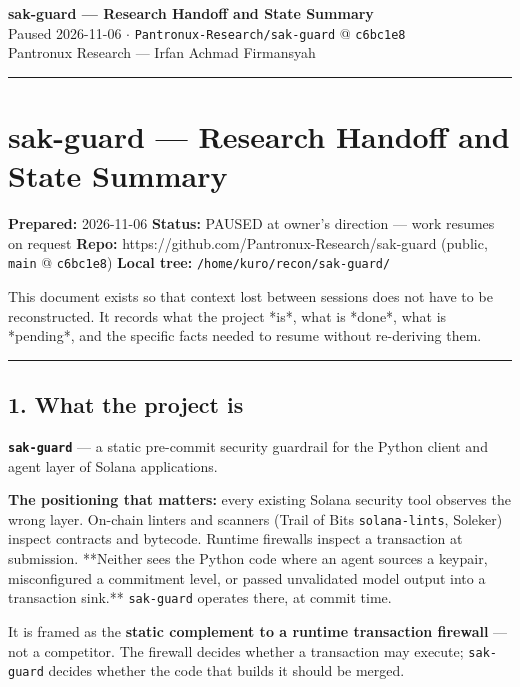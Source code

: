 \documentclass[10pt,a4paper]{article}
\begin{document}
\begin{center}
{\LARGE\bfseries sak-guard --- Research Handoff and State Summary}\\[4pt]
Paused 2026-11-06 $\cdot$ \texttt{Pantronux-Research/sak-guard} @ \texttt{c6bc1e8}\\[2pt]
{\small Pantronux Research --- Irfan Achmad Firmansyah}
\end{center}
\vspace{2pt}\hrule\vspace{6pt}
\section*{sak-guard --- Research Handoff and State Summary}

\textbf{Prepared:} 2026-11-06
\textbf{Status:} PAUSED at owner's direction --- work resumes on request
\textbf{Repo:} https://github.com/Pantronux-Research/sak-guard (public, \texttt{main} @ \texttt{c6bc1e8})
\textbf{Local tree:} \texttt{/home/kuro/recon/sak-guard/}

This document exists so that context lost between sessions does not have to be
reconstructed. It records what the project *is*, what is *done*, what is
*pending*, and the specific facts needed to resume without re-deriving them.

\vspace{3pt}\hrule\vspace{5pt}

\subsection*{1. What the project is}

\textbf{\texttt{sak-guard}} --- a static pre-commit security guardrail for the Python client
and agent layer of Solana applications.

\textbf{The positioning that matters:} every existing Solana security tool observes
the wrong layer. On-chain linters and scanners (Trail of Bits \texttt{solana-lints},
Soleker) inspect contracts and bytecode. Runtime firewalls inspect a transaction
at submission. **Neither sees the Python code where an agent sources a keypair,
misconfigured a commitment level, or passed unvalidated model output into a
transaction sink.** \texttt{sak-guard} operates there, at commit time.

It is framed as the \textbf{static complement to a runtime transaction firewall} ---
not a competitor. The firewall decides whether a transaction may execute;
\texttt{sak-guard} decides whether the code that builds it should be merged.
\end{document}
